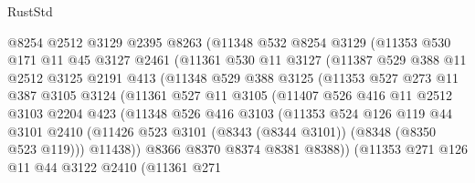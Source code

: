 \begin{lexlean}{RustStd}
\begin{coremodule}
{\begin{coremodule}
{{{{{{{{{{{{{{{{{{{{{{{{{{{{{{{{{{{{{{{{{{{{{{{{{{              @8254
              @2512
              @3129
              @2395
              @8263
              (@11348
                @532
                @8254
                @3129
                (@11353
                  @530
                  @171
                  @11
                  @45
                  @3127
                  @2461
                  (@11361
                    @530
                    @11
                    @3127
                    (@11387
                      @529
                      @388
                      @11
                      @2512
                      @3125
                      @2191
                      @413
                      (@11348
                        @529
                        @388
                        @3125
                        (@11353
                          @527
                          @273
                          @11
                          @387
                          @3105
                          @3124
                          (@11361
                            @527
                            @11
                            @3105
                            (@11407
                              @526
                              @416
                              @11
                              @2512
                              @3103
                              @2204
                              @423
                              (@11348
                                @526
                                @416
                                @3103
                                (@11353
                                  @524
                                  @126
                                  @119
                                  @44
                                  @3101
                                  @2410
                                  (@11426
                                    @523
                                    @3101
                                    (@8343 (@8344 @3101))
                                    (@8348 (@8350 @523 @119)))
                                  @11438))
                              @8366
                              @8370
                              @8374
                              @8381
                              @8388))
                          (@11353
                            @271
                            @126
                            @11
                            @44
                            @3122
                            @2410
                            (@11361
                              @271
}}}}}}}}}}}}}}}}}}}}}}}}}}}}}}}}}}}}}}}}}}}}}}}}}}
\end{coremodule}}
\end{coremodule}
\end{lexlean}
